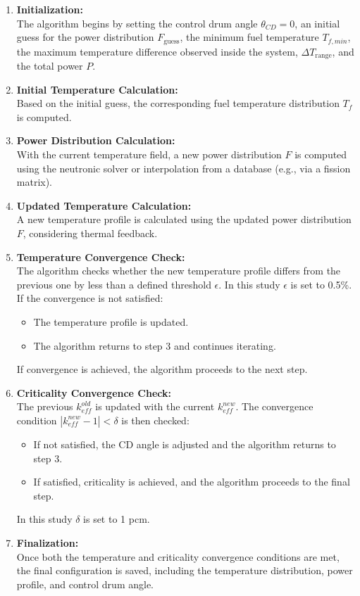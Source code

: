 \documentclass[preprint,review,12pt]{elsarticle}
\begin{document}
\begin{enumerate}
    \item \textbf{Initialization:} \\
    The algorithm begins by setting the control drum angle $\theta_{CD} = 0$, an initial guess for the power distribution $F_{\text{guess}}$, the minimum fuel temperature $T_{f,min}$, the maximum temperature difference observed inside the system, $\Delta T_{\text{range}}$, and the total power $P$.

    \item \textbf{Initial Temperature Calculation:} \\
    Based on the initial guess, the corresponding fuel temperature distribution $T_f$ is computed.

    \item \textbf{Power Distribution Calculation:} \\
    With the current temperature field, a new power distribution $F$ is computed using the neutronic solver or interpolation from a database (e.g., via a fission matrix).

    \item \textbf{Updated Temperature Calculation:} \\
    A new temperature profile is calculated using the updated power distribution $F$, considering thermal feedback.

    \item \textbf{Temperature Convergence Check:} \\
    The algorithm checks whether the new temperature profile differs from the previous one by less than a defined threshold $\epsilon$. In this study $\epsilon$ is set to 0.5\%. If the convergence is not satisfied:
    \begin{itemize}
        \item The temperature profile is updated.
        \item The algorithm returns to step 3 and continues iterating.
    \end{itemize}
    If convergence is achieved, the algorithm proceeds to the next step.

    \item \textbf{Criticality Convergence Check:} \\
    The previous $k_{eff}^{old}$ is updated with the current $k_{eff}^{new}$. The convergence condition $|k_{eff}^{new} - 1| < \delta$ is then checked:
    \begin{itemize}
        \item If not satisfied, the CD angle is adjusted and the algorithm returns to step 3.
        \item If satisfied, criticality is achieved, and the algorithm proceeds to the final step.
    \end{itemize}
    In this study $\delta$ is set to 1 pcm. 

    \item \textbf{Finalization:} \\
    Once both the temperature and criticality convergence conditions are met, the final configuration is saved, including the temperature distribution, power profile, and control drum angle.
\end{enumerate}
\end{document}
